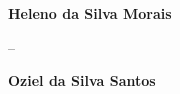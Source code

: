 \begin{agradecimentos}
   \textbf{Heleno da Silva Morais}
	\vspace*{\fill}
	\begin{flushleft}
--
\end{flushleft}
\vspace*{\fill}

\pagebreak

\textbf{Oziel da Silva Santos}

\vspace*{\fill}
\begin{flushleft}



\end{flushleft}
\vspace*{\fill}
\end{agradecimentos}
